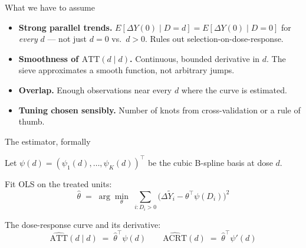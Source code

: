 \documentclass[aspectratio=169,12pt,t]{beamer}
\begin{document}
\begin{frame}{What we have to assume}
\vspace{0.4em}

\begin{itemize}\setlength\itemsep{0.7em}
  \item \textbf{Strong parallel trends.} \;$E[\Delta Y(0) \mid D = d] = E[\Delta Y(0) \mid D = 0]$ for \textit{every} $d$ --- not just $d = 0$ vs.\ $d > 0$. \;Rules out selection-on-dose-response.
  \item \textbf{Smoothness of $\text{ATT}(d \mid d)$.} \;Continuous, bounded derivative in $d$. \;The sieve approximates a smooth function, not arbitrary jumps.
  \item \textbf{Overlap.} \;Enough observations near every $d$ where the curve is estimated.
  \item \textbf{Tuning chosen sensibly.} \;Number of knots from cross-validation or a rule of thumb.
\end{itemize}

\vspace{0.4em}
\begin{center}
\end{center}
\end{frame}

\begin{frame}{The estimator, formally}
\vspace{0.7em}

Let $\psi(d) = (\psi_1(d), \ldots, \psi_K(d))^\top$ be the cubic B-spline basis at dose $d$.

\vspace{0.9em}

Fit OLS on the treated units:
\[
\widehat\theta \;=\; \arg\min_\theta \;\sum_{i: D_i > 0} \big(\Delta\tilde Y_i - \theta^\top \psi(D_i)\big)^2
\]

\vspace{0.9em}

The dose-response curve and its derivative:
\[
\widehat{\text{ATT}}(d \mid d) \;=\; \widehat\theta^\top \psi(d)
\qquad
\widehat{\text{ACRT}}(d) \;=\; \widehat\theta^\top \psi'(d)
\]

\vspace{0.5em}
\begin{center}
\end{center}
\end{frame}
\end{document}
